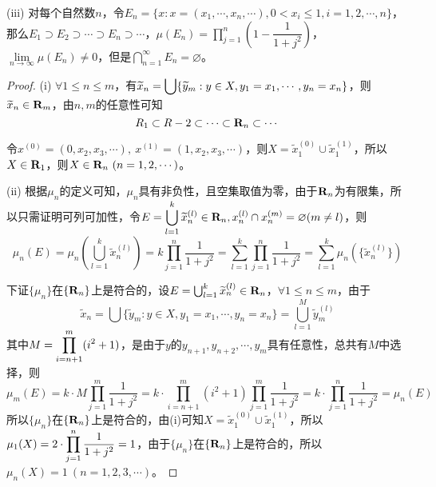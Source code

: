 \documentclass[12pt, a4paper, oneside]{ctexart}
\begin{document}
(iii) 对每个自然数$n$，令$E_n=\{x:x=(x_1,\cdots,x_n,\cdots),0<x_i\leqslant 1,i=1,2,\cdots,n\}$，那么$E_1\supset E_2\supset \cdots\supset E_n\supset \cdots$，$\displaystyle \mu(E_n)=\prod\limits_{j=1}^n\left(1-\dfrac{1}{1+j^2}\right)$，$\lim\limits_{n\rightarrow \infty}\mu(E_n)\neq 0$，但是$\displaystyle\bigcap\limits_{n=1}^\infty E_n = \varnothing$。
\def\wtd{\widetilde}
\begin{proof}
(i) $\forall 1\leqslant n \leqslant m$，有$\disp \wtd{x}_n = \bigcup\{\wtd{y}_m:y\in X, y_1=x_1,\cdots,y_n=x_n\}$，则$\wtd{x}_n\in \R_m$，由$n, m$的任意性可知
\begin{equation*}
    R_1\subset R-2\subset \cdots \subset \mathbf{R}_n\subset \cdots
\end{equation*}

令$x^{(0)} = (0, x_2, x_3,\cdots),\ x^{(1)} = (1, x_2, x_3,\cdots)$，则$X = \wtd{x}_1^{(0)}\cup\wtd{x}_1^{(1)}$，所以$X\in \mathbf{R}_1$，则$X\in\mathbf{R}_n\ (n=1,2,\cdots)$。

(ii) 根据$\mu_n$的定义可知，$\mu_n$具有非负性，且空集取值为零，由于$\mathbf{R}_n$为有限集，所以只需证明可列可加性，令$\disp E = \bigcup_{l=1}^k\wtd{x}_n^{(l)}\in \R_n,x_n^{(l)}\cap x_n^{(m)} = \varnothing(m\neq l)$，则
\begin{equation*}
    \mu_n(E) = \mu_n\left(\bigcup_{l=1}^k\wtd{x}_n^{(l)}\right) = k\prod_{j=1}^n\frac{1}{1+j^2}=\sum_{l=1}^k\prod_{j=1}^n\frac{1}{1+j^2}=\sum_{l=1}^k\mu_n(\{\wtd{x}_n^{(l)}\})
\end{equation*}

下证$\{\mu_n\}$在$\{\mathbf{R}_n\}$上是符合的，设$E =  \bigcup_{l=1}^k\wtd{x}_n^{(l)}\in \R_n$，$\forall 1\leqslant n\leqslant m$，由于
\begin{equation*}
    \wtd{x}_n= \bigcup\{\wtd{y}_m:y\in X,y_1 = x_1,\cdots, y_n = x_n\} = \bigcup_{l=1}^M\wtd{y}_m^{(l)}
\end{equation*}
其中$\displaystyle M = \prod_{i=n+1}^m(i^2+1)$，是由于$y$的$y_{n+1}, y_{n+2}, \cdots, y_m$具有任意性，总共有$M$中选择，则
\begin{equation*}
    \mu_m(E) = k\cdot M\prod_{j=1}^m\frac{1}{1+j^2} = k\cdot \prod_{i=n+1}^m(i^2+1)\prod_{j=1}^m\frac{1}{1+j^2} = k\cdot \prod_{j=1}^n\frac{1}{1+j^2} = \mu_n(E)
\end{equation*}
所以$\{\mu_n\}$在$\{\mathbf{R}_n\}$上是符合的，由(i)可知$X = \wtd{x}_1^{(0)}\cup\wtd{x}_1^{(1)}$，所以$\displaystyle \mu_1(X) = 2\cdot\prod_{j=1}^n\frac{1}{1+j^2} = 1$，由于$\{\mu_n\}$在$\{\mathbf{R}_n\}$上是符合的，所以$\mu_n(X) = 1\ (n = 1,2,3,\cdots)$。


\end{proof}
\end{document}

